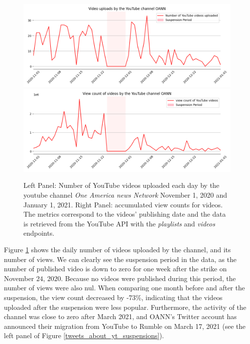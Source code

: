 \documentclass{article}
\begin{document}
\begin{figure}[h]
\hspace{-2em}
		\includegraphics[scale=0.32]{../figure/delete_youtube_1_oann.png}
		\includegraphics[scale=0.32]{../figure/delete_youtube_2_oann.png} 
	\caption{Left Panel: Number of YouTube videos uploaded each day by the youtube channel {\it One America news Network} November 1, 2020 and January 1, 2021. Right Panel: accumulated view counts for videos. The metrics correspond to the videos’  publishing date and the data is retrieved from the YouTube API with the {\it playlists} and  {\it videos} endpoints. }
	\label{delete_youtube_oann}
\end{figure}

\smallskip

Figure \ref{delete_youtube_oann} shows the daily number of videos uploaded by the channel, and its number of views. 
We can clearly see the suspension period in the data, as the number of published video is down to zero for one week after the strike on November $24$, $2020$. 
Because no videos were published during this period, the number of views were also nul.
When comparing one month before and after the suspension, the view count decreased by -73\%, indicating that the videos uploaded after the suspension were less popular. 
Furthermore, the activity of the channel was close to zero after March 2021, and OANN's Twitter account has announced their migration from YouTube to Rumble on March 17, 2021 (see the left panel of Figure \ref{tweets_about_yt_suspensions}).
\end{document}
